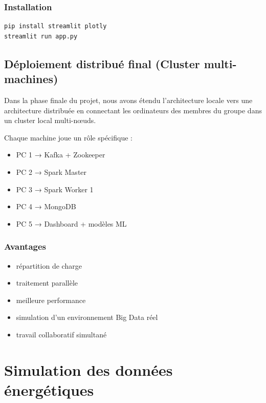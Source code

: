 \documentclass[1pt,a4paper]{report}
\begin{document}
\subsection{Installation}

\begin{verbatim}
pip install streamlit plotly
streamlit run app.py
\end{verbatim}

\section{Déploiement distribué final (Cluster multi-machines)}

Dans la phase finale du projet, nous avons étendu l’architecture locale vers une architecture distribuée en connectant les ordinateurs des membres du groupe dans un cluster local multi-nœuds.

Chaque machine joue un rôle spécifique :

\begin{itemize}
    \item PC 1 → Kafka + Zookeeper
    \item PC 2 → Spark Master
    \item PC 3 → Spark Worker 1
    \item PC 4 → MongoDB
    \item PC 5 → Dashboard + modèles ML
\end{itemize}

\subsection{Avantages}

\begin{itemize}
    \item répartition de charge
    \item traitement parallèle
    \item meilleure performance
    \item simulation d’un environnement Big Data réel
    \item travail collaboratif simultané
\end{itemize}

\chapter{Simulation des données énergétiques}
\end{document}

